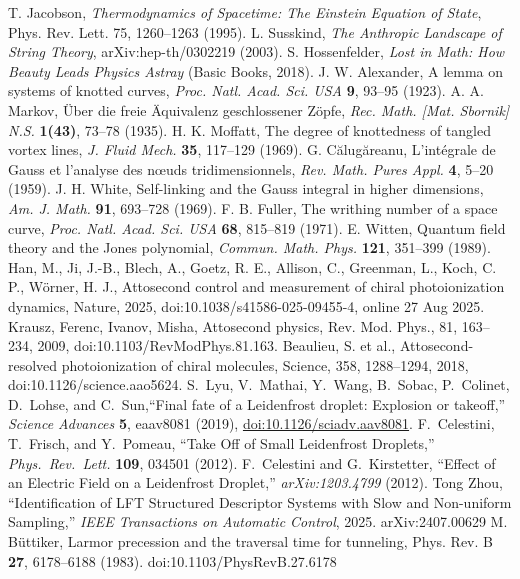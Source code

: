 \documentclass[10pt,reprint,aps,onecolumn,nofootinbib]{revtex4-2}
\begin{document}
\begin{thebibliography}{99}
     T. Jacobson, \emph{Thermodynamics of Spacetime: The Einstein Equation of State}, Phys. Rev. Lett. 75, 1260–1263 (1995).
     L. Susskind, \emph{The Anthropic Landscape of String Theory}, arXiv:hep-th/0302219 (2003).
     S. Hossenfelder, \emph{Lost in Math: How Beauty Leads Physics Astray} (Basic Books, 2018).
     J. W. Alexander, A lemma on systems of knotted curves, \emph{Proc. Natl. Acad. Sci. USA} \textbf{9}, 93–95 (1923).
     A. A. Markov, Über die freie Äquivalenz geschlossener Zöpfe, \emph{Rec. Math. [Mat. Sbornik] N.S.} \textbf{1(43)}, 73–78 (1935).
     H. K. Moffatt, The degree of knottedness of tangled vortex lines, \emph{J. Fluid Mech.} \textbf{35}, 117–129 (1969).
     G. Călugăreanu, L’intégrale de Gauss et l’analyse des nœuds tridimensionnels, \emph{Rev. Math. Pures Appl.} \textbf{4}, 5–20 (1959).
     J. H. White, Self-linking and the Gauss integral in higher dimensions, \emph{Am. J. Math.} \textbf{91}, 693–728 (1969).
     F. B. Fuller, The writhing number of a space curve, \emph{Proc. Natl. Acad. Sci. USA} \textbf{68}, 815–819 (1971).
     E. Witten, Quantum field theory and the Jones polynomial, \emph{Commun. Math. Phys.} \textbf{121}, 351–399 (1989).
     Han, M., Ji, J.-B., Blech, A., Goetz, R. E., Allison, C., Greenman, L., Koch, C. P., W\"orner, H. J., Attosecond control and measurement of chiral photoionization dynamics, Nature, 2025, doi:10.1038/s41586-025-09455-4, online 27 Aug 2025.
     Krausz, Ferenc, Ivanov, Misha, Attosecond physics, Rev. Mod. Phys., 81, 163--234, 2009, doi:10.1103/RevModPhys.81.163.
     Beaulieu, S. et al., Attosecond-resolved photoionization of chiral molecules, Science, 358, 1288--1294, 2018, doi:10.1126/science.aao5624.
     S.~Lyu, V.~Mathai, Y.~Wang, B.~Sobac, P.~Colinet, D.~Lohse, and C.~Sun,``Final fate of a Leidenfrost droplet: Explosion or takeoff,'' \emph{Science Advances} \textbf{5}, eaav8081 (2019), \href{https://doi.org/10.1126/sciadv.aav8081}{doi:10.1126/sciadv.aav8081}.
     F.~Celestini, T.~Frisch, and Y.~Pomeau, ``Take Off of Small Leidenfrost Droplets,'' \emph{Phys.\ Rev.\ Lett.} \textbf{109}, 034501 (2012).
     F.~Celestini and G.~Kirstetter, ``Effect of an Electric Field on a Leidenfrost Droplet,'' \emph{arXiv:1203.4799} (2012).
     Tong Zhou, ``Identification of LFT Structured Descriptor Systems with Slow and Non-uniform Sampling,'' \emph{IEEE Transactions on Automatic Control}, 2025. arXiv:2407.00629
     M. B{\"u}ttiker, Larmor precession and the traversal time for tunneling, Phys. Rev. B \textbf{27}, 6178--6188 (1983). doi:10.1103/PhysRevB.27.6178


\end{thebibliography}
\end{document}
